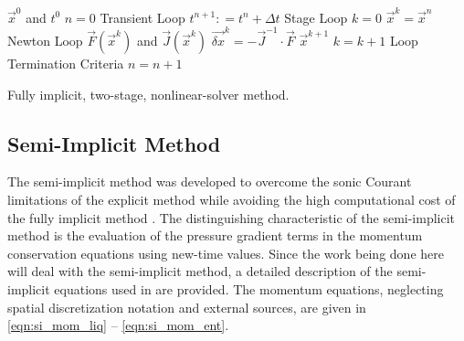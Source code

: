 \begin{algo}[H]
\setlength{\baselineskip}{0.625\baselineskip}
\begin{algorithmic}[1]
\Require $\vec{x}^{0}$ and $t^{0}$
\Set $n = 0$
\Loop \; Transient Loop
    \State $t^{n+1} : = t^{n} + \Delta t$
     \; Stage Loop
    \State $k = 0$
    \State $\vec{x}^{k} = \vec{x}^{n}$
    \Loop \; Newton Loop
		\Calculate $\vec{F}(\vec{x}^{k})$ and $\vec{J}(\vec{x}^{k})$
		\Calculate $\vec{\delta x}^k = - \vec{J}^{-1}\cdot\vec{F}$
		\BlackBox $\vec{x}^{k+1}$
		\State $k = k + 1$
		\BlackBox Loop Termination Criteria
	\EndLoop	
	\EndFor
	\State $n = n + 1$
\EndLoop
\end{algorithmic}
\caption{Fully implicit, two-stage, nonlinear-solver method.}
\label{algo:implicit}
\end{algo}

\subsection{Semi-Implicit Method}
\label{subsect:semi_implicit}

The semi-implicit method was developed to overcome the sonic Courant limitations of the explicit method while avoiding the high  computational cost of the fully implicit method \cite{Liles1978}.
The distinguishing characteristic of the semi-implicit method is the evaluation of the pressure gradient terms in the momentum conservation equations using new-time values. 
Since the work being done here will deal with the semi-implicit method, a detailed description of the semi-implicit equations used in \cobra{} are provided.
The momentum equations, neglecting spatial discretization notation and external sources, are given in \eqref{eqn:si_mom_liq} -- \eqref{eqn:si_mom_ent}.

